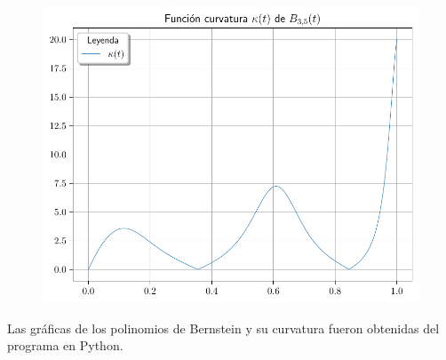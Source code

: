 \begin{frame}
    \begin{solution}
        \begin{figure}[ht!]
            \centering
            \includegraphics[width=.72\paperwidth]{p1_curvature}
        \end{figure}
    \end{solution}
\end{frame}

\begin{frame}[fragile]
    Las gráficas de los polinomios de Bernstein y su curvatura fueron
    obtenidas del programa en Python.
    \begin{solution}
        \begin{columns}
            \begin{column}{0.48\textwidth}
                \inputminted[fontsize=\tiny,firstline=3,lastline=4]{python}{p1.py}

                \

                \inputminted[fontsize=\tiny,firstline=10,lastline=20]{python}{p1.py}

            \end{column}
            \begin{column}{0.48\textwidth}
                \inputminted[fontsize=\tiny,firstline=23,lastline=27]{python}{p1.py}

                \

                \inputminted[fontsize=\tiny,firstline=34,lastline=40]{python}{p1.py}
            \end{column}
        \end{columns}
    \end{solution}
\end{frame}
